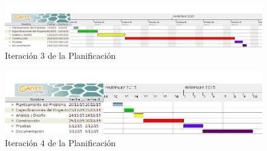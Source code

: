 \begin{figure}[htb]
\centering
\includegraphics[width=1\textwidth]{./imagenes/iteracion3}
\caption{Iteración 3 de la Planificación} \label{fig:iteracion3}
\end{figure}

\begin{figure}[htb]
\centering
\includegraphics[width=1\textwidth]{./imagenes/iteracion4}
\caption{Iteración 4 de la Planificación} \label{fig:iteracion4}
\end{figure}
